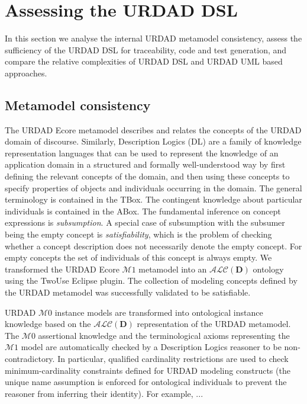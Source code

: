 \section{Assessing the URDAD DSL \label{sec:assessment}}

In this section we analyse the internal URDAD metamodel consistency, assess the sufficiency of the URDAD DSL for traceability, code and test generation, and compare the relative complexities of URDAD DSL and URDAD UML based approaches.


\subsection{Metamodel consistency}

The URDAD Ecore metamodel describes and relates the concepts of the URDAD domain of discourse. Similarly, Description Logics (DL) are a family of knowledge representation languages that can be used to represent the knowledge of an application domain in a structured and formally well-understood way by first defining the relevant concepts of the domain, and then using these concepts to specify properties of objects and individuals occurring in the domain. The general terminology is contained in the TBox. The contingent knowledge about particular individuals is contained in the ABox. The fundamental inference on concept expressions is \emph{subsumption}. A special case of subsumption with the subsumer being the empty concept is \emph{satisfiability}, which is the problem of checking whether a concept description does not necessarily denote the empty concept. For empty concepts the set of individuals of this concept is always empty. We transformed the URDAD Ecore $\mathcal{M}1$ metamodel into an $\mathcal{ALC}(\textbf{D})$ ontology using the TwoUse \cite{parreiras_using_2010} Eclipse plugin. The collection of modeling concepts defined by the URDAD metamodel was successfully validated to be satisfiable.

URDAD $\mathcal{M}0$ instance models are transformed into ontological instance knowledge based on the $\mathcal{ALC}(\textbf{D})$ representation of the URDAD metamodel. The $\mathcal{M}0$ assertional knowledge and the terminological axioms representing the $\mathcal{M}1$ model are automatically checked by a Description Logics reasoner to be non-contradictory. In particular, qualified cardinality restrictions are used to check minimum-cardinality constraints defined for URDAD modeling constructs (the unique name assumption is enforced for ontological individuals to prevent the reasoner from inferring their identity). For example, ...

